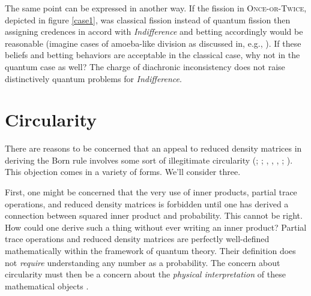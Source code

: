 \documentclass[onecolumn,secnumarabic,amsmath,amssymb,balancelastpage,nofootinbib]{article}
\begin{document}
The same point can be expressed in another way.  If the fission in \textsc{Once-or-Twice}, depicted in figure \ref{case1}, was classical fission instead of quantum fission then assigning credences in accord with \emph{Indifference} and betting accordingly would be reasonable (imagine cases of amoeba-like division as discussed in, e.g., \citealp{parfit1971}).  If these beliefs and betting behaviors are acceptable in the classical case, why not in the quantum case as well?  The charge of diachronic inconsistency does not raise distinctively quantum problems for \emph{Indifference}.
  

\section{Circularity}\label{subsys}

There are reasons to be concerned that an appeal to reduced density matrices in deriving the Born rule involves some sort of illegitimate circularity (\citealp{zeh1997,baker2007}; \citealp[.2]{schlosshauer}; \citeauthor{zurek2003b}, \citeyear{zurek2003b}, \citeyear{zurek2005}, \citeyear{zurek2010}; \citealp[]{kent2010}). This objection comes in a variety of forms.  We'll consider three.

First, one might be concerned that the very use of inner products, partial trace operations, and reduced density matrices is forbidden until one has derived a connection between squared inner product and probability.  This cannot be right.  How could one derive such a thing without ever writing an inner product?  Partial trace operations and reduced density matrices are perfectly well-defined mathematically within the framework of quantum theory.  Their definition does not \emph{require} understanding any number as a probability.  The concern about circularity must then be a concern about the \emph{physical interpretation} of these mathematical objects \citep[see also][FAQ \#6]{zurek2010}.
\end{document}
